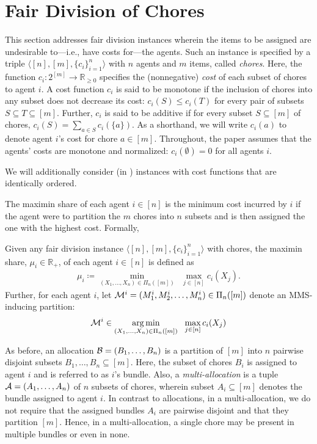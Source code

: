 \section{Fair Division of Chores}
\label{sec:chores}

This section addresses fair division instances wherein the items to be assigned are undesirable to---i.e., have costs for---the agents. Such an instance is specified by a triple $\langle[n],[m],\{c_i\}_{i=1}^n\rangle$ with $n$ agents and $m$ items, called \textit{chores}. Here, the function $c_i:2^{[m]}\to\mathbb{R}_{\geq 0}$ specifies the (nonnegative) \textit{cost} of each subset of chores to agent $i$. A cost function $c_i$ is said to be monotone if the inclusion of chores into any subset does not decrease its cost: $c_i(S) \leq c_i(T)$ for every pair of subsets $S \subseteq T \subseteq[m]$. Further, $c_i$ is said to be additive if for every subset $S \subseteq [m]$ of chores, $c_i(S) = \sum_{a \in S} c_i(\{a\})$. As a shorthand, we will write $c_i(a)$ to denote agent $i$'s cost for chore $a \in [m]$. Throughout, the paper assumes that the agents' costs are monotone and normalized: $c_i(\emptyset)=0$ for all agents $i$. 

We will additionally consider (in ) instances with cost functions that are identically ordered. 

The maximin share of each agent $i \in [n]$ is the minimum cost incurred by $i$ if the agent were to partition the $m$ chores into $n$ subsets and is then assigned the one with the highest cost. Formally,
\begin{definition} 
Given any fair division instance $\langle [n], [m], \{c_i\}_{i=1}^n \rangle$ with chores, the {maximin share}, $\mu_i \in \mathbb{R}_+$, of each agent $i \in [n]$ is defined as 
\begin{align*}
\mu_i \coloneqq  \min_{(X_1,\dots, X_n) \in \Pi_n([m])} \ \ \max_{j\in[n]} c_i(X_{j}).
\end{align*}
Further, for each agent $i$, let $\mathcal{M}^i=(M^i_1, M^i_2, \ldots, M^i_n) \in \Pi_n([m])$ denote an {MMS-inducing partition}:
\begin{align*}
\mathcal{M}^i \in \operatorname*{arg\,min}_{(X_1,\dots, X_n) \in \Pi_n([m])} \ \ \max_{j\in[n]} c_i(X_{j})
\end{align*}
\end{definition} 

As before, an allocation $\mathcal{B}=(B_1,\ldots, B_n)$ is a partition of $[m]$ into $n$ pairwise disjoint subsets $B_1,\ldots, B_n \subseteq [m]$. Here, the subset of chores $B_i$ is assigned to agent $i$ and is referred to as $i$'s bundle. Also, a \textit{multi-allocation} is a tuple $\mathcal{A}=(A_1,\ldots,A_n)$ of $n$ subsets of chores, wherein subset $A_i \subseteq [m]$ denotes the bundle assigned to agent $i$. In contrast to allocations, in a multi-allocation, we do not require that the assigned bundles $A_i$ are pairwise disjoint and that they partition $[m]$. Hence, in a multi-allocation, a single chore may be present in multiple bundles or even in none. 


